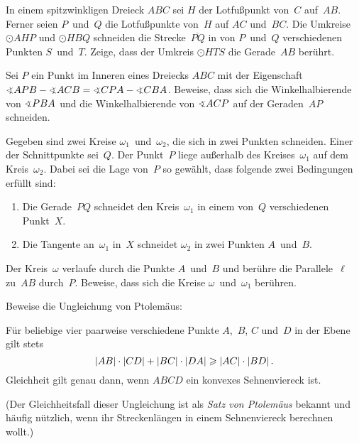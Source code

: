 \begin{aufgabe*}\label{aufgabe:450943}
	In einem spitzwinkligen Dreieck $ABC$ sei $H$ der Lotfußpunkt von~$C$ auf~$AB$. Ferner seien $P$~und~$Q$ die Lotfußpunkte von~$H$ auf $AC$ und~$BC$. Die Umkreise $\odot AHP$ und $\odot HBQ$ schneiden die Strecke~$\overline{PQ}$ in von $P$~und~$Q$ verschiedenen Punkten $S$~und~$T$. Zeige, dass der Umkreis $\odot HTS$ die Gerade~$AB$ berührt.
\end{aufgabe*}

\begin{aufgabe*}[*]\label{aufgabe:IMO1996}
	Sei $P$ ein Punkt im Inneren eines Dreiecks $ABC$ mit der Eigenschaft $\winkel APB-\winkel ACB=\winkel CPA-\winkel CBA$. Beweise, dass sich die Winkelhalbierende von $\winkel PBA$ und die Winkelhalbierende von $\winkel ACP$ auf der Geraden~$AP$ schneiden.
\end{aufgabe*}

\begin{aufgabe*}[*]\label{aufgabe:521243}
	Gegeben sind zwei Kreise $\omega_1$~und~$\omega_2$, die sich in zwei Punkten schneiden. Einer der Schnittpunkte sei~$Q$. Der Punkt~$P$ liege außerhalb des Kreises~$\omega_1$ auf dem Kreis~$\omega_2$. Dabei sei die Lage von~$P$ so gewählt, dass folgende zwei Bedingungen erfüllt sind:
	\begin{enumerate}[label={$(\Alph*)$},ref={$(\Alph*)$}]
		\item Die Gerade~$PQ$ schneidet den Kreis~$\omega_1$ in einem von~$Q$ verschiedenen Punkt~$X$.
		\item Die Tangente an~$\omega_1$ in~$X$ schneidet $\omega_2$ in zwei Punkten $A$~und~$B$.
	\end{enumerate}
	Der Kreis~$\omega$ verlaufe durch die Punkte $A$~und~$B$ und berühre die Parallele~$\ell$ zu~$AB$ durch~$P$. Beweise, dass sich die Kreise $\omega$~und~$\omega_1$ berühren.
\end{aufgabe*}

\begin{aufgabe*}[*]\label{aufgabe:Ptolemaeus}
	Beweise die Ungleichung von Ptolemäus:
	\begin{satzmitnamen}
		Für beliebige vier paarweise verschiedene Punkte $A$,~$B$, $C$ und~$D$ in der Ebene gilt stets
		\begin{equation*}
			\lvert AB\rvert\cdot \lvert CD\rvert+\lvert BC\rvert\cdot\lvert DA\rvert\geqslant \lvert AC\rvert\cdot \lvert BD\rvert\,.
		\end{equation*}
		Gleichheit gilt genau dann, wenn $ABCD$ ein konvexes Sehnenviereck ist.
	\end{satzmitnamen}
	(Der Gleichheitsfall dieser Ungleichung ist als \emph{Satz von Ptolemäus} bekannt und häufig nützlich, wenn ihr Streckenlängen in einem Sehnenviereck berechnen wollt.)
\end{aufgabe*}

